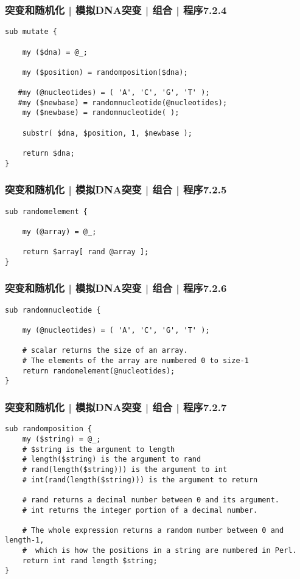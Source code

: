 \begin{frame}[fragile]
  \frametitle{突变和随机化 | 模拟DNA突变 | 组合 | 程序7.2.4}
  \vspace{-1.5em}
\begin{lstlisting}[firstnumber=54]
sub mutate {

    my ($dna) = @_;

    my ($position) = randomposition($dna);

   #my (@nucleotides) = ( 'A', 'C', 'G', 'T' );
   #my ($newbase) = randomnucleotide(@nucleotides);
    my ($newbase) = randomnucleotide( );

    substr( $dna, $position, 1, $newbase );

    return $dna;
}
\end{lstlisting}
\end{frame}

\begin{frame}[fragile]
  \frametitle{突变和随机化 | 模拟DNA突变 | 组合 | 程序7.2.5}
  \vspace{-1.5em}
\begin{lstlisting}[firstnumber=80]
sub randomelement {

    my (@array) = @_;

    return $array[ rand @array ];
}
\end{lstlisting}
\end{frame}

\begin{frame}[fragile]
  \frametitle{突变和随机化 | 模拟DNA突变 | 组合 | 程序7.2.6}
  \vspace{-1.5em}
\begin{lstlisting}[firstnumber=94]
sub randomnucleotide {

    my (@nucleotides) = ( 'A', 'C', 'G', 'T' );

    # scalar returns the size of an array.
    # The elements of the array are numbered 0 to size-1
    return randomelement(@nucleotides);
}
\end{lstlisting}
\end{frame}

\begin{frame}[fragile]
  \frametitle{突变和随机化 | 模拟DNA突变 | 组合 | 程序7.2.7}
  \vspace{-1.5em}
\begin{lstlisting}[firstnumber=110,basicstyle=\footnotesize\tt,numberstyle=\scriptsize]
sub randomposition {
    my ($string) = @_;
    # $string is the argument to length
    # length($string) is the argument to rand
    # rand(length($string))) is the argument to int
    # int(rand(length($string))) is the argument to return

    # rand returns a decimal number between 0 and its argument.
    # int returns the integer portion of a decimal number.

    # The whole expression returns a random number between 0 and length-1,
    #  which is how the positions in a string are numbered in Perl.
    return int rand length $string;
}
\end{lstlisting}
\end{frame}

